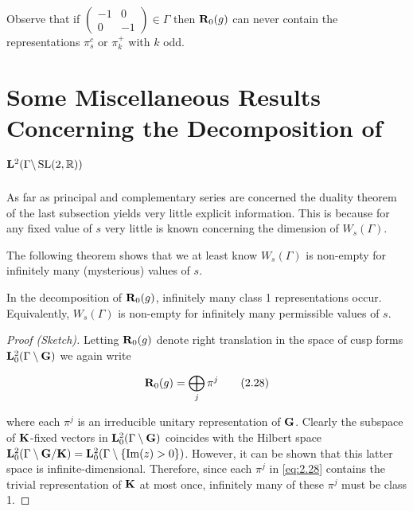 Observe that if $\begin{pmatrix} -1 & 0 \\ 0 & -1 \end{pmatrix} \in \Gamma$ then $\mathbf{R}_0(g)$ can never contain the representations $\pi_s^{c}$ or $\pi_k^{+}$ with $k$ odd.

\section{Some Miscellaneous Results Concerning the Decomposition of \allowbreak\texorpdfstring{$\mathbf{L}^2(\Gamma\backslash \operatorname{SL}(2,\mathbb{R}))$}{L2(Gamma SL(2,R))}}\label{sec:2c}

As far as principal and complementary series are concerned the duality theorem of the last subsection yields very little explicit information. This is because for any fixed value of $s$ very little is known concerning the dimension of $W_s(\Gamma)$.

The following theorem shows that we at least know $W_s(\Gamma)$ is non-empty for infinitely many (mysterious) values of $s$.

\begin{theorem}\label{thm:2.11}

In the decomposition of $\mathbf{R}_0(g)$, infinitely many class 1 representations occur. Equivalently, $W_s(\Gamma)$ is non-empty for infinitely many permissible values of $s$.

\end{theorem}

\begin{proof}[Proof (Sketch)]

Letting $\mathbf{R}_0(g)$ denote right translation in the space of cusp forms $\mathbf{L}_0^2(\Gamma \setminus \mathbf{G})$ we again write

\begin{equation}\label{eq:2.28}
\mathbf{R}_0(g) = \bigoplus_j \pi^{j}\tag{2.28}
\end{equation}

where each $\pi^{j}$ is an irreducible unitary representation of $\mathbf{G}$. Clearly the subspace of $\mathbf{K}$-fixed vectors in $\mathbf{L}_0^2(\Gamma \setminus \mathbf{G})$ coincides with the Hilbert space $\mathbf{L}_0^2(\Gamma \setminus \mathbf{G} / \mathbf{K}) = \mathbf{L}_0^2(\Gamma \setminus \{\operatorname{Im}(z) > 0\})$. However, it can be shown that this latter space is infinite-dimensional. Therefore, since each $\pi^{j}$ in \eqref{eq:2.28} contains the trivial representation of $\mathbf{K}$ at most once, infinitely many of these $\pi^{j}$ must be class 1.

\end{proof}


